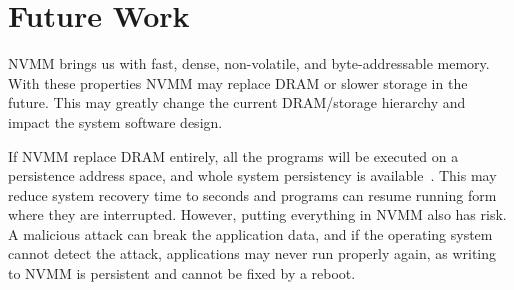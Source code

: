\section{Future Work} 
\label{sec:future}

NVMM brings us with fast, dense,
non-volatile, and byte-addressable memory. With these properties NVMM may
replace DRAM or slower storage in the future.
This may greatly change the current DRAM/storage
hierarchy and impact the system software design.

If NVMM replace DRAM entirely, all the programs will be executed on a
persistence address space, and whole system persistency is available~\cite{WSP}.
This may reduce system recovery time to seconds and programs can resume
running form where they are interrupted. However, putting everything in
NVMM also has risk. A malicious attack can break the application data, and if
the operating system cannot detect the attack, applications may never run
properly again, as writing to NVMM is persistent and cannot be fixed by a reboot. 


